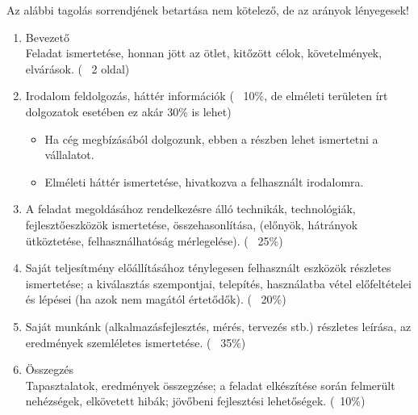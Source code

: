 Az alábbi tagolás sorrendjének betartása nem kötelező, de az arányok lényegesek!
\begin{enumerate}
	\item Bevezető\\
Feladat ismertetése, honnan jött az ötlet, kitőzött célok, követelmények, elvárások. (~ 2 oldal)
	\item Irodalom feldolgozás, háttér információk (~ 10\%, de elméleti területen írt dolgozatok esetében ez akár 30\% is lehet)
	\begin{itemize}
		\item Ha cég megbízásából dolgozunk, ebben a részben lehet ismertetni a vállalatot. 
		\item Elméleti háttér ismertetése, hivatkozva a felhasznált irodalomra. 
	\end{itemize}
	\item A feladat megoldásához rendelkezésre álló technikák, technológiák, fejlesztőeszközök ismertetése, összehasonlítása, (előnyök, hátrányok ütköztetése, felhasználhatóság mérlegelése). (~ 25\%)
	\item Saját teljesítmény előállításához ténylegesen felhasznált eszközök részletes ismertetése; a kiválasztás szempontjai, telepítés, használatba vétel előfeltételei és lépései (ha azok nem magától értetődők). (~ 20\%)
	\item Saját munkánk (alkalmazásfejlesztés, mérés, tervezés stb.) részletes leírása, az eredmények szemléletes ismertetése. (~ 35\%)
	\item Összegzés\\ Tapasztalatok, eredmények összegzése; a feladat elkészítése során felmerült nehézségek, elkövetett hibák; jövőbeni fejlesztési lehetőségek. (~10\%)
\end{enumerate}